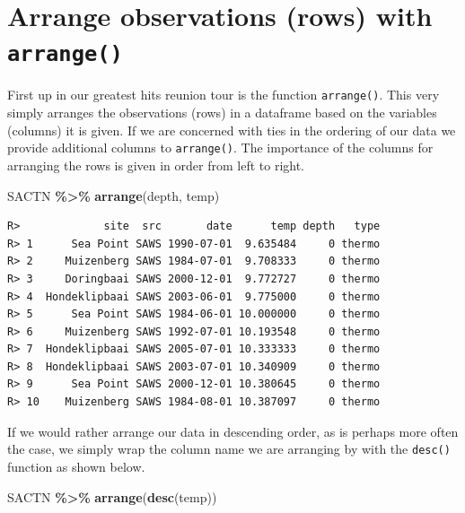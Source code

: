 \documentclass[
]{book}
\newenvironment{Shaded}{\begin{snugshade}}{\end{snugshade}}
\newcommand{\KeywordTok}[1]{\textcolor[rgb]{0.13,0.29,0.53}{\textbf{#1}}}
\newcommand{\NormalTok}[1]{#1}
\newcommand{\OperatorTok}[1]{\textcolor[rgb]{0.81,0.36,0.00}{\textbf{#1}}}
\newcommand{\StringTok}[1]{\textcolor[rgb]{0.31,0.60,0.02}{#1}}
\begin{document}
\hypertarget{arrange-observations-rows-with-arrange}{%
\section{\texorpdfstring{Arrange observations (rows) with \texttt{arrange()}}{Arrange observations (rows) with arrange()}}\label{arrange-observations-rows-with-arrange}}

First up in our greatest hits reunion tour is the function \texttt{arrange()}. This very simply arranges the observations (rows) in a dataframe based on the variables (columns) it is given. If we are concerned with ties in the ordering of our data we provide additional columns to \texttt{arrange()}. The importance of the columns for arranging the rows is given in order from left to right.

\begin{Shaded}
\begin{Highlighting}[]
\NormalTok{SACTN }\OperatorTok{\%>\%}\StringTok{ }
\StringTok{  }\KeywordTok{arrange}\NormalTok{(depth, temp)}
\end{Highlighting}
\end{Shaded}

\begin{verbatim}
R>             site  src       date      temp depth   type
R> 1      Sea Point SAWS 1990-07-01  9.635484     0 thermo
R> 2     Muizenberg SAWS 1984-07-01  9.708333     0 thermo
R> 3     Doringbaai SAWS 2000-12-01  9.772727     0 thermo
R> 4  Hondeklipbaai SAWS 2003-06-01  9.775000     0 thermo
R> 5      Sea Point SAWS 1984-06-01 10.000000     0 thermo
R> 6     Muizenberg SAWS 1992-07-01 10.193548     0 thermo
R> 7  Hondeklipbaai SAWS 2005-07-01 10.333333     0 thermo
R> 8  Hondeklipbaai SAWS 2003-07-01 10.340909     0 thermo
R> 9      Sea Point SAWS 2000-12-01 10.380645     0 thermo
R> 10    Muizenberg SAWS 1984-08-01 10.387097     0 thermo
\end{verbatim}

If we would rather arrange our data in descending order, as is perhaps more often the case, we simply wrap the column name we are arranging by with the \texttt{desc()} function as shown below.

\begin{Shaded}
\begin{Highlighting}[]
\NormalTok{SACTN }\OperatorTok{\%>\%}\StringTok{ }
\StringTok{  }\KeywordTok{arrange}\NormalTok{(}\KeywordTok{desc}\NormalTok{(temp))}
\end{Highlighting}
\end{Shaded}
\end{document}
